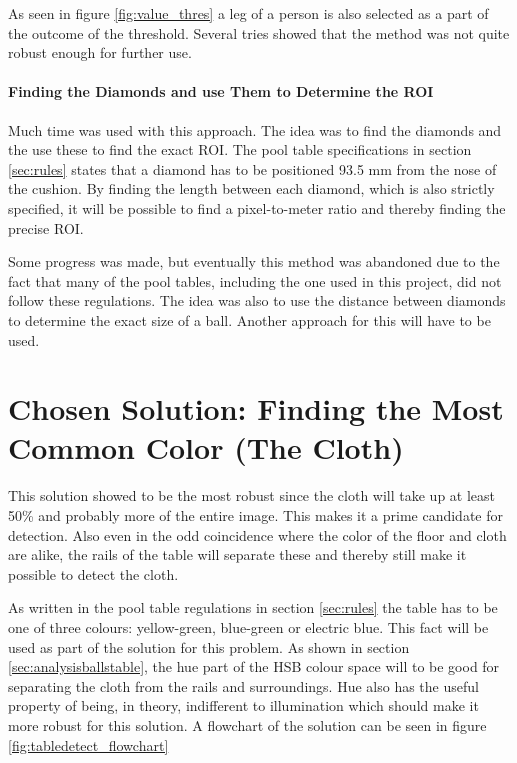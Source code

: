 As seen in figure \ref{fig:value_thres} a leg of a person is also selected as a part of the outcome of the threshold. Several tries showed that the method was not quite robust enough for further use.

\paragraph{Finding the Diamonds and use Them to Determine the ROI}
Much time was used with this approach. The idea was to find the diamonds and the use these to find the exact ROI. The pool table specifications in section \ref{sec:rules} states that a diamond has to be positioned 93.5 mm from the nose of the cushion. By finding the length between each diamond, which is also strictly specified, it will be possible to find a pixel-to-meter ratio and thereby finding the precise ROI.

Some progress was made, but eventually this method was abandoned due to the fact that many of the pool tables, including the one used in this  project, did not follow these regulations. The idea was also to use the distance between diamonds to determine the exact size of a ball. Another approach for this will have to be used.

\section{Chosen Solution: Finding the Most Common Color (The Cloth)}
This solution showed to be the most robust since the cloth will take up at least 50\% and probably more of the entire image. This makes it a prime candidate for detection. Also even in the odd coincidence where the color of the floor and cloth are alike, the rails of the table will separate these and thereby still make it possible to detect the cloth.

As written in the pool table regulations in section \ref{sec:rules} the table has to be one of three colours: yellow-green, blue-green or electric blue. This fact will be used as part of the solution for this problem. As shown in section \ref{sec:analysisballstable}, the hue part of the HSB colour space will to be good for separating the cloth from the rails and surroundings. Hue also has the useful property of being, in theory, indifferent to illumination which should make it more robust for this solution. A flowchart of the solution can be seen in figure \ref{fig:tabledetect_flowchart}


